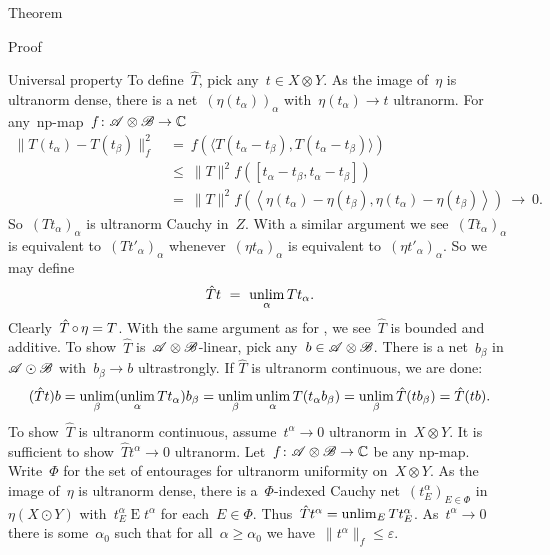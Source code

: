 \documentclass[b]{subfiles}
\begin{document}
\begin{parsec}
\begin{point}{Theorem}
\begin{point}{Proof}
\begin{point}{Universal property}
To define~$\hat{T}$, pick any~$t \in X \otimes Y$.
As the image of~$\eta$ is ultranorm dense,
there is a net~$(\eta(t_\alpha))_\alpha$ with~$\eta(t_\alpha) \to t$ ultranorm.
For any~np-map~$f\colon \mathscr{A}\otimes \mathscr{B} \to \mathbb{C}$
\begin{align*}
    \|T(t_\alpha) - T(t_\beta) \|_f^2 
        &\ =\ f(\langle T(t_\alpha - t_\beta), T(t_\alpha - t_\beta) \rangle) \\
        & \ \leq \ \|T\|^2 f([t_\alpha-t_\beta, t_\alpha - t_\beta]) \\
        & \ = \ \|T\|^2 f(\left<\eta (t_\alpha)-\eta(t_\beta), \eta(t_\alpha) - \eta(t_\beta)\right>) \ \to\  0.
\end{align*}
So~$(T t_\alpha)_\alpha$ is ultranorm Cauchy in~$Z$.
With a similar argument we see~$(Tt_\alpha)_\alpha $
    is equivalent to~$ (T t'_\alpha)_\alpha$
whenever~$(\eta t_\alpha)_\alpha $ is equivalent
    to~$ (\eta t'_\alpha)_\alpha$.
So we may define
\begin{equation*}
\hat{T} t \ = \ \unlim_\alpha T t_\alpha.
\end{equation*}
Clearly~$\hat{T} \mathop{\circ} \eta = T$.
With the same argument as for ,
    we see~$\hat{T}$ is bounded and additive.
To show~$\hat{T}$ is~$\mathscr{A}\otimes \mathscr{B}$-linear,
    pick any~$b \in \mathscr{A} \otimes \mathscr{B}$.
There is a net~$b_\beta$ in~$\mathscr{A} \odot \mathscr{B}$
    with~$b_\beta \to b$ ultrastrongly.
If $\hat{T}$ is ultranorm continuous, we are done:
\begin{equation*}
    (\hat{T} t) b
    = \unlim_\beta (\unlim_\alpha T t_\alpha) b_\beta\\
     = \unlim_\beta \unlim_\alpha T (t_\alpha b_\beta) \\
     = \unlim_\beta \hat{T} (t b_\beta)\\
     = \hat{T} (tb).
\end{equation*}
To show~$\hat{T}$ is ultranorm continuous,
    assume~$t^\alpha \to 0$ ultranorm in~$X \otimes Y$.
It is sufficient to show~$\hat{T} t^\alpha \to 0$ ultranorm.
Let~$f\colon \mathscr{A}\otimes \mathscr{B} \to \mathbb{C}$ be any np-map.
Write~$\Phi$ for the set of entourages for ultranorm uniformity
    on~$X \otimes Y$.
As the image of~$\eta$ is ultranorm dense,
there is a~$\Phi$-indexed Cauchy net~$(t^\alpha_E)_{E \in \Phi}$ in
    $\eta (X \odot Y)$
    with~$t^\alpha_E \mathrel{E} t^\alpha$
    for each~$E \in \Phi$.
Thus~$\hat{T} t^\alpha = \unlim_E T t^\alpha_E$.
As~$t^\alpha \to 0$
    there is some~$\alpha_0$
    such that for all~$\alpha \geq \alpha_0$
    we have~$\|t^\alpha \|_f \leq \varepsilon$.

\end{point}
\end{point}
\end{point}
\end{parsec}
\end{document}
